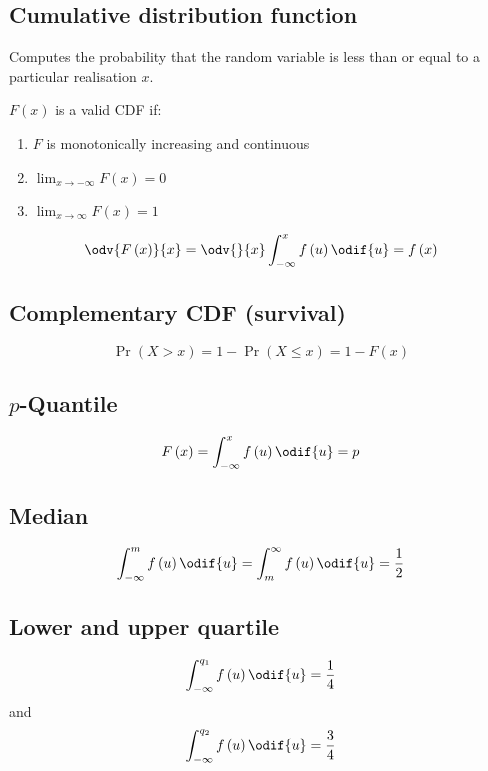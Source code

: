 \documentclass{article}
\begin{document}
\begin{minipage}{126.1962963mm}
\begin{multicols}{2}
        \subsection{Cumulative distribution function}
        Computes the probability that the random variable is
        less than or equal to a particular realisation \(x\).

        \(F\left( x \right)\) is a valid CDF if:
        \begin{enumerate}
            \item \(F\) is monotonically increasing and continuous
            \item \(\lim_{x \to -\infty} F\left( x \right) = 0\)
            \item \(\lim_{x \to \infty} F\left( x \right) = 1\)
        \end{enumerate}
        \begin{equation*}
            \odv{F\left( x \right)}{x} = \odv{}{x} \int_{-\infty}^x f\left( u \right) \odif{u} = f\left( x \right)
        \end{equation*}
        \subsection{Complementary CDF (survival)}
        \begin{equation*}
            \Pr{\left( X > x \right)} = 1 - \Pr{\left( X \leq x \right)} = 1 - F\left( x \right)
        \end{equation*}
        \subsection{\(p\)-Quantile}
        \begin{equation*}
            F\left( x \right) = \int_{-\infty}^x f\left( u \right) \odif{u} = p
        \end{equation*}
        \subsection{Median}
        \begin{equation*}
            \int_{-\infty}^m f\left( u \right) \odif{u} = \int^{\infty}_m f\left( u \right) \odif{u} = \frac{1}{2}
        \end{equation*}
        \subsection{Lower and upper quartile}
        \begin{equation*}
            \int_{-\infty}^{q_1} f\left( u \right) \odif{u} = \frac{1}{4}
        \end{equation*}
        and
        \begin{equation*}
            \int_{-\infty}^{q_2} f\left( u \right) \odif{u} = \frac{3}{4}
        \end{equation*}

\end{multicols}
\end{minipage}
\end{document}
